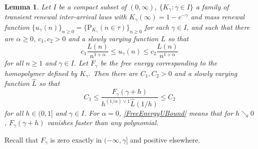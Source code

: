\documentclass[11pt]{article}
\newtheorem{lemm}[theo]{Lemma}
\theoremstyle{definition}
\numberwithin{equation}{section}
\numberwithin{figure}{section}
\numberwithin{table}{section}
\newcommand{\ga}{\alpha}
\newcommand{\gga}{\gamma}
\newcommand\bP{\ensuremath{\mathrm{P}}}
\begin{document}
\begin{lemm}\label{FreeEnergyU}
Let $I$ be a compact subset of $(0,\infty)$, $\{K_\gga \colon \gga \in I\}$ a family of transient renewal inter-arrival laws with $K_\gga(\infty) = 1 - e^{- \gga}$ and mass renewal function $\{u_\gga(n)\}_{n\ge 0} = \{\bP_{K_\gga}(n\in\tau)\}_{n\ge 0}$ for each $\gga \in I$, and such that there are $\ga \geq 0$, $c_1,c_2 > 0$ and a slowly varying function $L$ so that
\begin{equation}\label{ReturnTimeUBound}
c_1 \frac{L(n)}{n^{1 + \ga}} \leq u_\gga(n) \leq c_2 \frac{L(n)}{n^{1 + \ga}}
\end{equation}
for all $n \geq 1$ and $\gga \in I$. Let $F_\gga$ be the free energy corresponding to the homopolymer defined by $K_\gga$. Then there are $C_1,C_2 > 0$ and a slowly varying function $\hat L$ so that
\begin{equation}\label{FreeEnergyUBound}
C_1 \leq \frac{F_\gga(\gga + h)}{h^{(1/\ga) \vee 1} \hat L(1/h)} \leq C_2
\end{equation}
for all $h \in (0,1]$ and $\gga \in I$. For $\ga = 0$, \eqref{FreeEnergyUBound} means that for $h \searrow 0$, $F_\gga(\gga + h)$ vanishes faster than any polynomial.
\end{lemm}

Recall that $F_\gga$ is zero exactly in $(- \infty,\gga]$ and positive elsewhere.
\end{document}
